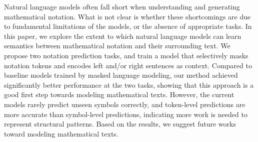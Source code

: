 Natural language models often fall short when understanding and generating mathematical notation. What is not clear is whether these shortcomings are due to fundamental limitations of the models, or the absence of appropriate tasks. In this paper, we explore the extent to which natural language models can learn semantics between mathematical notation and their surrounding text. We propose two notation prediction tasks, and train a  model that selectively masks notation tokens and encodes left and/or right sentences as context. Compared to baseline models trained by masked language modeling, our method achieved significantly better performance at the two tasks, showing that this approach is a good first step towards modeling mathematical texts. However, the current models rarely predict unseen symbols correctly, and token-level predictions are more accurate than symbol-level predictions, indicating more work is needed to represent structural patterns. Based on the results, we suggest future works toward modeling mathematical texts.
